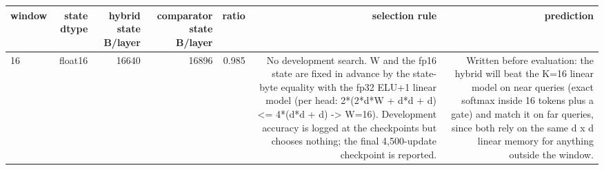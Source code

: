 \begin{tabular}{lrrrrrr}
\toprule
window & state dtype & hybrid state B/layer & comparator state B/layer & ratio & selection rule & prediction \\
\midrule
16 & float16 & 16640 & 16896 & 0.985 & No development search. W and the fp16 state are fixed in advance by the state-byte equality with the fp32 ELU+1 linear model (per head: 2*(2*d*W + d*d + d) <= 4*(d*d + d) -> W=16). Development accuracy is logged at the checkpoints but chooses nothing; the final 4,500-update checkpoint is reported. & Written before evaluation: the hybrid will beat the K=16 linear model on near queries (exact softmax inside 16 tokens plus a gate) and match it on far queries, since both rely on the same d x d linear memory for anything outside the window. \\
\bottomrule
\end{tabular}
